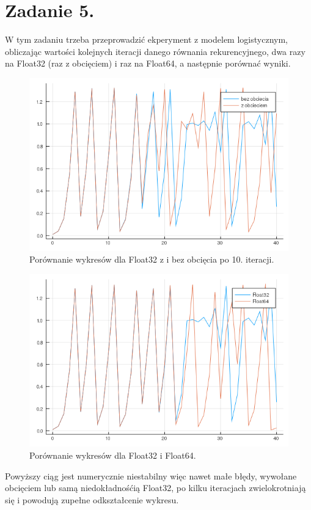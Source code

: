 \documentclass{article}
\begin{document}
\section{Zadanie 5.}
W tym zadaniu trzeba przeprowadzić ekperyment z modelem logistycznym, obliczając wartości kolejnych iteracji danego równania rekurencyjnego, dwa razy na Float32 (raz z obcięciem) i raz na Float64, a następnie porównać wyniki.
\begin{figure}[H]
	\includegraphics[width=\linewidth]{zad5_1.png}
	\caption{Porównanie wykresów dla Float32 z i bez obcięcia po 10. iteracji.}
	\label{fig:cut}
\end{figure}
\begin{figure}[H]
	\includegraphics[width=\linewidth]{zad5_2.png}
	\caption{Porównanie wykresów dla Float32 i Float64.}
	\label{fig:floats}
\end{figure}
Powyższy ciąg jest numerycznie niestabilny więc nawet małe błędy, wywołane obcięciem lub samą niedokładnośćią Float32, po kilku iteracjach zwielokrotniają się i powodują zupełne odkształcenie wykresu.
\end{document}

